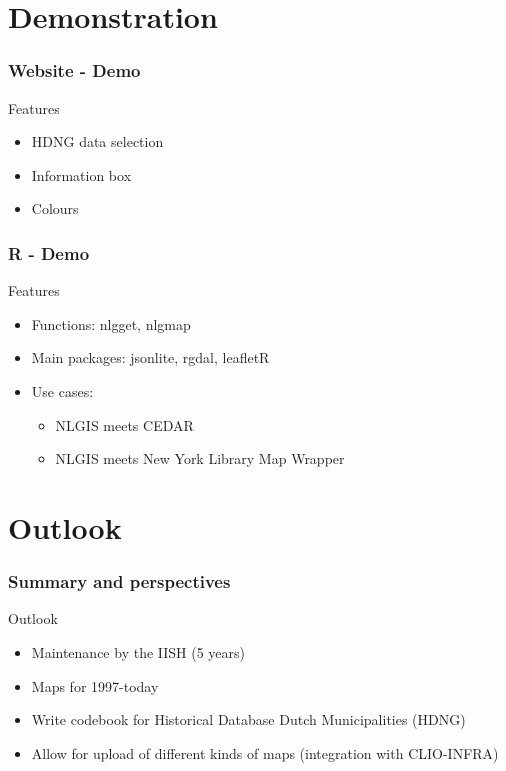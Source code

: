 \documentclass{beamer}
\begin{document}
\section{Demonstration}
\begin{frame}
	\frametitle{Website - Demo}
	Features
		\begin{itemize}
			\item HDNG data selection
			\item Information box
			\item Colours
		\end{itemize}
\end{frame}
\begin{frame}
	\frametitle{R - Demo}
	Features
		\begin{itemize}
			\item Functions: nlgget, nlgmap
			\item Main packages: jsonlite, rgdal, leafletR
			\item Use cases: 
				\begin{itemize}
					\item NLGIS meets CEDAR
					\item NLGIS meets New York Library Map Wrapper
				\end{itemize}		
		\end{itemize}
\end{frame}

\section{Outlook}
\begin{frame}
	\frametitle{Summary and perspectives}
	Outlook
		\begin{itemize}
			\item Maintenance by the IISH (5 years)
			\item Maps for 1997-today
			\item Write codebook for Historical Database Dutch Municipalities (HDNG)
			\item Allow for upload of different kinds of maps (integration with CLIO-INFRA)
		\end{itemize}
\end{frame}
\end{document}
